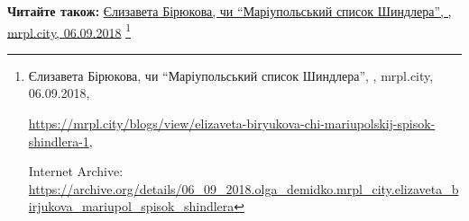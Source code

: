  
 
 
 
 

\def\pubIA{https://archive.org/details/06_09_2018.olga_demidko.mrpl_city.elizaveta_birjukova_mariupol_spisok_shindlera}
\def\pubTitle{Єлизавета Бірюкова, чи \enquote{Маріупольський список Шиндлера}}
\def\pubDate{06.09.2018}
\def\pubOrigin{https://mrpl.city/blogs/view/elizaveta-biryukova-chi-mariupolskij-spisok-shindlera-1}
\def\pubAuthor{\pubAuthorDemidko}

\textbf{Читайте також:} \href{\pubIA}{%
\pubTitle, \pubAuthor, mrpl.city, \pubDate}%
\footnote{\pubTitle, \pubAuthor, mrpl.city, \pubDate, \par\url{\pubOrigin}, \par Internet Archive: \url{\pubIA}}
